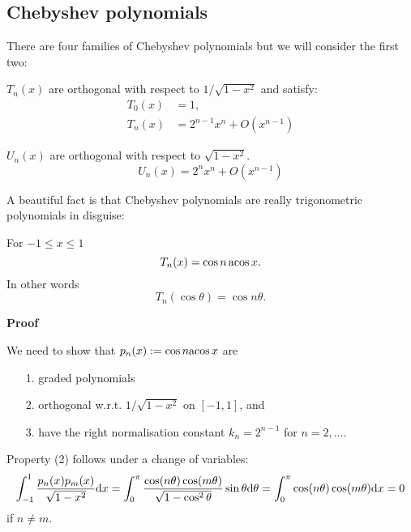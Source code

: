 \subsection{Chebyshev polynomials}
There are four families of Chebyshev polynomials but we will consider the first two:

\begin{definition} $T_n(x)$ are orthogonal with respect to $1/\sqrt{1-x^2}$ and satisfy:
\begin{align*}
T_0(x) &= 1, \\
T_n(x) &= 2^{n-1} x^n + O(x^{n-1})
\end{align*}
\end{definition}

\begin{definition} $U_n(x)$ are orthogonal with respect to $\sqrt{1-x^2}$.
\[
U_n(x) = 2^n x^n + O(x^{n-1})
\]
\end{definition}

A beautiful fact is that Chebyshev polynomials are really trigonometric polynomials in disguise:

\begin{theorem} For $-1 \ensuremath{\leq} x \ensuremath{\leq} 1$
\[
T_n(x) = \cos n\, {\rm acos}\, x.
\]
In other words
\[
T_n(\cos \ensuremath{\theta}) = \cos n \ensuremath{\theta}.
\]
\end{theorem}
\textbf{Proof}

We need to show that $p_n(x) := \cos n {\rm acos}\, x$ are

\begin{itemize}
\item[1. ] graded polynomials


\item[2. ] orthogonal w.r.t. $1/\sqrt{1-x^2}$ on $[-1,1]$, and


\item[3. ] have the right normalisation constant $k_n = 2^{n-1}$ for $n = 2,\ensuremath{\ldots}$.

\end{itemize}
Property (2) follows under a change of variables:
\[
\int_{-1}^1 {p_n(x) p_m(x) \over \sqrt{1-x^2}} {\rm d} x =
\int_0^\ensuremath{\pi} {\cos(n\ensuremath{\theta}) \cos(m\ensuremath{\theta}) \over \sqrt{1-\cos^2 \ensuremath{\theta}}} \sin \ensuremath{\theta} {\rm d} \ensuremath{\theta} =
\int_0^\ensuremath{\pi} \cos(n\ensuremath{\theta}) \cos(m\ensuremath{\theta}) {\rm d} x = 0
\]
if $n \ensuremath{\neq} m$.

